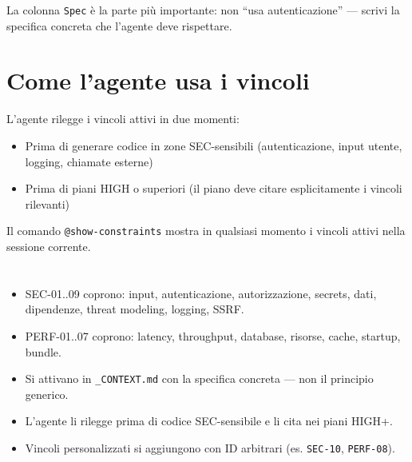 La colonna \texttt{Spec} è la parte più importante: non ``usa autenticazione'' --- scrivi la specifica concreta che l'agente deve rispettare.

\section{Come l'agente usa i vincoli}
\label{sec:11-uso}

L'agente rilegge i vincoli attivi in due momenti:
\begin{itemize}
  \item Prima di generare codice in zone SEC-sensibili (autenticazione, input utente, logging, chiamate esterne)
  \item Prima di piani HIGH o superiori (il piano deve citare esplicitamente i vincoli rilevanti)
\end{itemize}

Il comando \texttt{@show-constraints} mostra in qualsiasi momento i vincoli attivi nella sessione corrente.

\section*{\LabelSummary}

\begin{itemize}
  \item SEC-01..09 coprono: input, autenticazione, autorizzazione, secrets, dati, dipendenze, threat modeling, logging, SSRF.
  \item PERF-01..07 coprono: latency, throughput, database, risorse, cache, startup, bundle.
  \item Si attivano in \texttt{\_CONTEXT.md} con la specifica concreta --- non il principio generico.
  \item L'agente li rilegge prima di codice SEC-sensibile e li cita nei piani HIGH+.
  \item Vincoli personalizzati si aggiungono con ID arbitrari (es. \texttt{SEC-10}, \texttt{PERF-08}).
\end{itemize}
